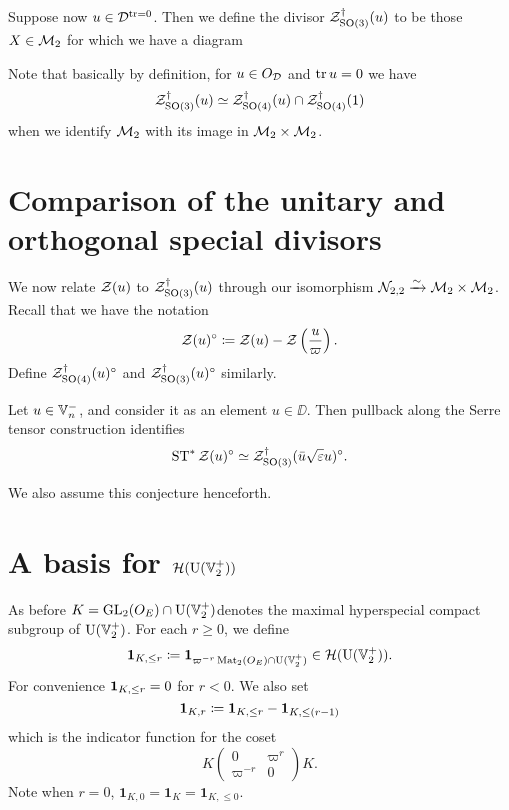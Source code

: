 \begin{definition}
  [$\ZO3(u)$]
  Suppose now $u \in \mathcal D^{\operatorname{tr} = 0}$.
  Then we define the divisor $\ZO3(u)$ to be those $X \in \mathcal M_2$
  for which we have a diagram
  \begin{center}
  \end{center}
  Note that basically by definition, for $u \in O_\mathcal D$ and $\operatorname{tr} u = 0$ we have
  \[ \mathcal Z^{\dagger}_{\operatorname{SO}(3)}(u) \simeq \mathcal Z^{\dagger}_{\operatorname{SO}(4)}(u) \cap \mathcal Z^{\dagger}_{\operatorname{SO}(4)}(1) \]
  when we identify $\mathcal M_2$ with its image in $\mathcal M_2 \times \mathcal M_2$.
\end{definition}

\section{Comparison of the unitary and orthogonal special divisors}
We now relate $\mathcal Z(u)$ to $\ZO3(u)$ through our
isomorphism $\mathcal N_{2,2} \xrightarrow{\sim} \mathcal M_2 \times \mathcal M_2$.
Recall that we have the notation
\[ \mathcal Z(u)^\circ \coloneqq \mathcal Z(u) - \mathcal Z\left( \frac{u}{\varpi} \right). \]
Define $\mathcal Z^{\dagger}_{\operatorname{SO}(4)}(u)^\circ$ and $\mathcal Z^{\dagger}_{\operatorname{SO}(3)}(u)^\circ$ similarly.

\begin{conjecture}
  \label{conj:serre_pullback_divisor}
  Let $u \in \mathbb V_n^-$, and consider it as an element $u \in \DD$.
  Then pullback along the Serre tensor construction identifies
  \[ \operatorname{ST}^\ast \mathcal Z(u)^\circ \simeq \mathcal Z^{\dagger}_{\operatorname{SO}(3)}(\bar u \sqrt{\varepsilon} u)^\circ. \]
\end{conjecture}
We also assume this conjecture henceforth.

\section{A basis for $\mathcal H(\operatorname{U}(\mathbb V_2^+))$}
\label{sec:hecke_unitary_basis}

As before $K = \operatorname{GL}_2(O_E) \cap \operatorname{U}(\mathbb V_2^+)$denotes the maximal hyperspecial compact subgroup of $\operatorname{U}(\mathbb V_2^+)$.
For each $r \ge 0$, we define
\[ \mathbf{1}_{K, \le r} \coloneqq \mathbf{1}_{\varpi^{-r} \operatorname{Mat}_2(O_E) \cap \operatorname{U}(\mathbb V_2^+)} \in \mathcal H(\operatorname{U}(\mathbb V_2^+)). \]
For convenience $\mathbf{1}_{K, \le r} = 0$ for $r < 0$.
We also set
\[  \mathbf{1}_{K, r} \coloneqq \mathbf{1}_{K, \le r} - \mathbf{1}_{K, \le (r-1)} \]
which is the indicator function for the coset
\[ K \begin{pmatrix} 0 & \varpi^r \\ \varpi^{-r} & 0 \end{pmatrix} K. \]
Note when $r = 0$, $\mathbf{1}_{K, 0} = \mathbf{1}_K = \mathbf{1}_{K, \le 0}$.

